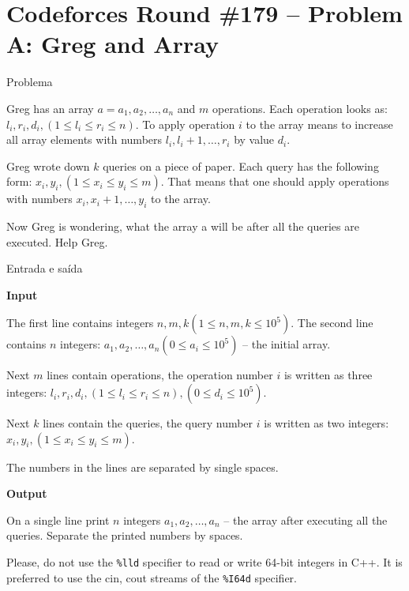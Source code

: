 \section{Codeforces Round \#179 -- Problem A: Greg and Array}

\begin{frame}[fragile]{Problema}

Greg has an array $a = a_1, a_2, \ldots, a_n$ and $m$ operations. Each operation looks as: 
$l_i, r_i, d_i, (1\leq l_i\leq r_i\leq n)$. To apply operation $i$ to the array means to increase 
all array elements with numbers $l_i, l_i + 1, \ldots, r_i$ by value $d_i$.

Greg wrote down $k$ queries on a piece of paper. Each query has the following form: 
$x_i, y_i, (1\leq x_i\leq y_i\leq m)$. That means that one should apply operations with numbers 
$x_i, x_i + 1, \ldots, y_i$ to the array.

Now Greg is wondering, what the array a will be after all the queries are executed. Help Greg.

\end{frame}

\begin{frame}[fragile]{Entrada e saída}

\textbf{Input}

The first line contains integers $n, m, k (1\leq n, m, k\leq 10^5)$. The second line contains 
$n$ integers: $a_1, a_2, \ldots, a_n (0\leq a_i\leq 10^5)$ -- the initial array.

Next $m$ lines contain operations, the operation number $i$ is written as three integers: 
$l_i, r_i, d_i, (1\leq l_i\leq r_i\leq n), (0\leq d_i\leq 10^5)$.

Next $k$ lines contain the queries, the query number $i$ is written as two integers: 
$x_i, y_i, (1\leq x_i\leq y_i\leq m)$.

The numbers in the lines are separated by single spaces.

\textbf{Output}

On a single line print $n$ integers $a_1, a_2,\ldots, a_n$ -- the array after executing all the queries. Separate the printed numbers by spaces.

Please, do not use the \texttt{\%lld} specifier to read or write 64-bit integers in C++. It is preferred to use the cin, cout streams of the \texttt{\%I64d} specifier.

\end{frame}

